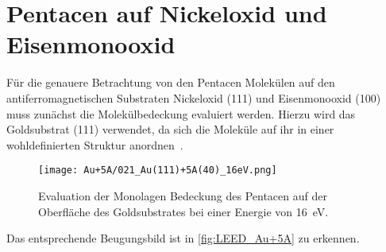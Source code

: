     \section{Pentacen auf Nickeloxid und Eisenmonooxid} \label{sec:Ergeb}
        Für die genauere Betrachtung von den Pentacen Molekülen auf den antiferromagnetischen Substraten Nickeloxid (111) und Eisenmonooxid (100) muss zunächst die Molekülbedeckung evaluiert werden.
        Hierzu wird das Goldsubstrat (111) verwendet, da sich die Moleküle auf ihr in einer wohldefinierten Struktur anordnen~\cite{5A_4}.
        \begin{figure}
            \centering
            \texttt{[image: Au+5A/021\_Au(111)+5A(40)\_16eV.png]}
            \caption{Evaluation der Monolagen Bedeckung des Pentacen auf der Oberfläche des Goldsubstrates bei einer Energie von \SI{16}{\electronvolt}.}
            \label{fig:LEED_Au+5A}
        \end{figure}
        Das entsprechende Beugungsbild ist in \autoref{fig:LEED_Au+5A} zu erkennen.
    
